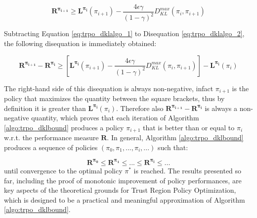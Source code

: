                 \begin{equation}
                    \label{eq:trpo_dklalgo_2}
                    \mathbf{R^{\pi_{i+1}}} \geq \mathbf{L^{\pi_{i}}}(\pi_{i+1}) - \frac{4 \epsilon \gamma}{\left( 1 - \gamma \right)^2} D_{KL}^{max}(\pi_{i}, \pi_{i+1})
                \end{equation}
                
                Subtracting Equation \ref{eq:trpo_dklalgo_1} to Disequation \ref{eq:trpo_dklalgo_2}, the following disequation is immediately obtained:
                
                \begin{equation}
                    \label{eq:trpo_dklalgo_3}
                    \mathbf{R^{\pi_{i+1}}} - \mathbf{R^{\pi_{i}}} \geq \left[ \mathbf{L^{\pi_{i}}}(\pi_{i+1}) - \frac{4 \epsilon \gamma}{\left( 1 - \gamma \right)^2} D_{KL}^{max}(\pi_{i}, \pi_{i+1}) \right] - \mathbf{L^{\pi_{i}}}(\pi_{i})
                \end{equation}
                
                The right-hand side of this disequation is always non-negative, infact $\pi_{i+1}$ is the policy that maximizes the quantity between the square brackets, thus by definition it is greater than $\mathbf{L^{\pi_{i}}}(\pi_{i})$. Therefore also $\mathbf{R^{\pi_{i+1}}} - \mathbf{R^{\pi_{i}}}$ is always a non-negative quantity, which proves that each iteration of Algorithm \ref{algo:trpo_dklbound} produces a policy $\pi_{i+1}$ that is better than or equal to $\pi_{i}$ w.r.t. the performance measure $\mathbf{R}$. In general, Algorithm \ref{algo:trpo_dklbound} produces a sequence of policies $(\pi_{0}, \pi_{1}, ..., \pi_{i}, ...)$ such that:
                
                \begin{equation}
                    \label{eq:trpo_dklalgo_4}
                    \mathbf{R^{\pi_{0}}} \leq \mathbf{R^{\pi_{1}}} \leq ... \leq \mathbf{R^{\pi_{i}}} \leq ...
                \end{equation}
                until convergence to the optimal policy $\pi^*$ is reached. \newline
                The results presented so far, including the proof of  monotonic improvement of policy performances, are key aspects of the theoretical grounds for Trust Region Policy Optimization, which is designed to be a practical and meaningful approximation of Algorithm \ref{algo:trpo_dklbound}.
        
